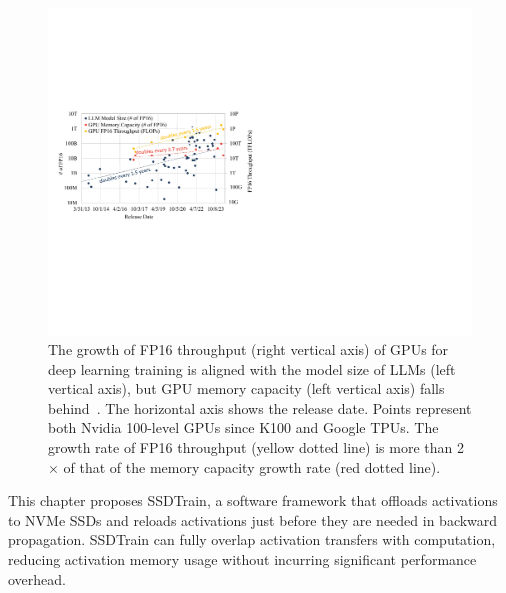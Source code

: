 \begin{figure}[!t]
\centering
\includegraphics[width=\linewidth]{figures/SSDTrain/trend_scale_aux_words.pdf}
\caption{\label{fig:trend_scale} The growth of FP16 throughput (right vertical axis) of GPUs for deep learning training is aligned with the model size of LLMs (left vertical axis), but GPU memory capacity (left vertical axis) falls behind~\cite{theepochaiAnnouncingEpochAI2023}. The horizontal axis shows the release date.  Points represent both Nvidia 100-level GPUs since K100 and Google TPUs. The growth rate of FP16 throughput (yellow dotted line) is more than 2$\times$ of that of the memory capacity growth rate (red dotted line).}
\end{figure}

This chapter proposes SSDTrain, a software framework that offloads activations to NVMe SSDs and reloads activations just before they are needed in backward propagation.  SSDTrain can fully overlap activation transfers with computation, reducing activation memory usage without incurring significant performance overhead. 

